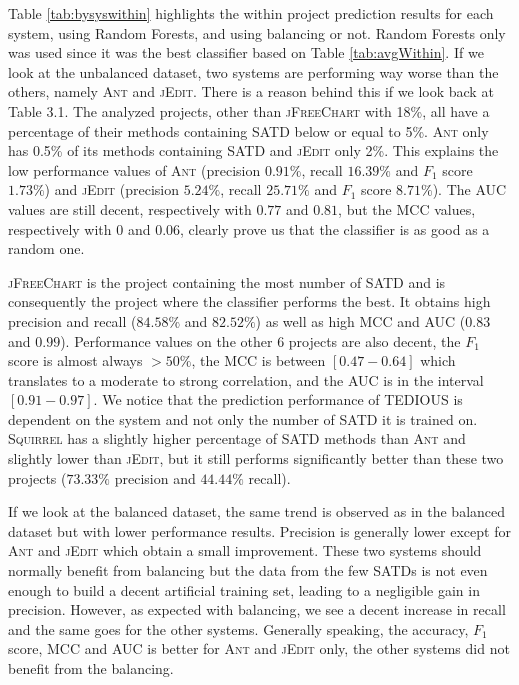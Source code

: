 Table \ref{tab:bysyswithin} highlights the within project prediction results for each system, using Random Forests, and using balancing or not. Random Forests only was used since it was the best classifier based on Table \ref{tab:avgWithin}. If we look at the unbalanced dataset, two systems are performing way worse than the others, namely \textsc{Ant} and \textsc{jEdit}. There is a reason behind this if we look back at Table 3.1. The analyzed projects, other than \textsc{jFreeChart} with 18\%, all have a percentage of their methods containing SATD below or equal to 5\%. \textsc{Ant} only has 0.5\% of its methods containing SATD and \textsc{jEdit} only 2\%. This explains the low performance values of \textsc{Ant} (precision $0.91\%$, recall $16.39\%$ and $F_1$ score $1.73\%$) and \textsc{jEdit} (precision $5.24\%$, recall $25.71\%$ and $F_1$ score $8.71\%$). The AUC values are still decent, respectively with $0.77$ and $0.81$, but the MCC values, respectively with $0$ and $0.06$, clearly prove us that the classifier is as good as a random one.

\textsc{jFreeChart} is the project containing the most number of SATD and is consequently the project where the classifier performs the best. It obtains high precision and recall ($84.58\%$ and  $82.52\%$) as well as high MCC and AUC ($0.83$ and $0.99$). Performance values on the other 6 projects are also decent, the $F_1$ score is almost always $>50\%$, the MCC is between $[0.47-0.64]$ which translates to a moderate to strong correlation, and the AUC is in the interval $[0.91-0.97]$. We notice that the prediction performance of TEDIOUS is dependent on the system and not only the number of SATD it is trained on. \textsc{Squirrel} has a slightly higher percentage of SATD methods than \textsc{Ant} and slightly lower than \textsc{jEdit}, but it still performs significantly better than these two projects ($73.33\%$ precision and $44.44\%$ recall). 

If we look at the balanced dataset, the same trend is observed as in the balanced dataset but with lower performance results. Precision is generally lower except for \textsc{Ant} and \textsc{jEdit} which obtain a small improvement. These two systems should normally benefit from balancing but the data from the few SATDs is not even enough to build a decent artificial training set, leading to a negligible gain in precision. However, as expected with balancing, we see a decent increase in recall and the same goes for the other systems. Generally speaking, the accuracy, $F_1$ score, MCC and AUC is better for \textsc{Ant} and \textsc{jEdit} only, the other systems did not benefit from the balancing.

